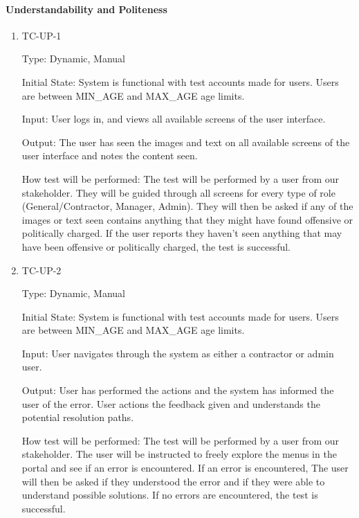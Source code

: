 \documentclass[12pt, titlepage]{article}
\begin{document}
\paragraph{Understandability and Politeness}
\begin{enumerate}
  \item{TC-UP-1\\}

    Type: Dynamic, Manual

    Initial State: System is functional with test accounts made for users. Users
    are between MIN\_AGE and MAX\_AGE age limits.

    Input: User logs in, and views all available screens of the user interface.

    Output: The user has seen the images and text on all available screens of
    the user interface and notes the content seen.

    How test will be performed: The test will be performed by a user from our
    stakeholder. They will be guided through all screens for every type of role
    (General/Contractor, Manager, Admin). They will then be asked if any of the
    images or text seen contains anything that they might have found offensive
    or politically charged. If the user reports they haven't seen anything that
    may have been offensive or politically charged, the test is successful.

  \item{TC-UP-2\\}

    Type: Dynamic, Manual

    Initial State: System is functional with test accounts made for users. Users
    are between MIN\_AGE and MAX\_AGE age limits.

    Input: User navigates through the system as either a contractor
    or admin user.

    Output: User has performed the actions and the system has informed the user
    of the error. User actions the feedback given and understands the potential
    resolution paths.

    How test will be performed: The test will be performed by a user from our
    stakeholder. The user will be instructed to freely explore the
    menus in the portal and see if an error is encountered.
    If an error is encountered, The user will then be asked if they
    understood the error
    and if they were able to understand possible solutions.
    If no errors are encountered, the test is successful.

\end{enumerate}
\end{document}
